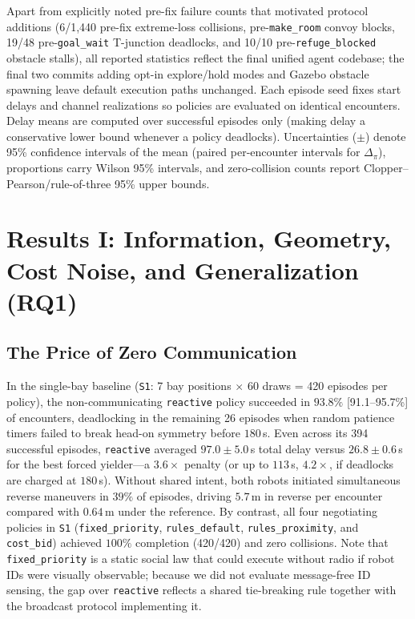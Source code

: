 \documentclass[letterpaper,journal]{IEEEtran}
\newcommand{\cb}{\texttt{cost\_bid}}
\begin{document}
Apart from explicitly noted pre-fix failure counts that motivated protocol additions (6/1,440 pre-fix extreme-loss collisions, pre-\texttt{make\_room} convoy blocks, 19/48 pre-\texttt{goal\_wait} T-junction deadlocks, and 10/10 pre-\texttt{refuge\_blocked} obstacle stalls), all reported statistics reflect the final unified agent codebase; the final two commits adding opt-in explore/hold modes and Gazebo obstacle spawning leave default execution paths unchanged. Each episode seed fixes start delays and channel realizations so policies are evaluated on identical encounters. Delay means are computed over successful episodes only (making delay a conservative lower bound whenever a policy deadlocks). Uncertainties ($\pm$) denote 95\% confidence intervals of the mean (paired per-encounter intervals for $\Delta_\pi$), proportions carry Wilson 95\% intervals, and zero-collision counts report Clopper--Pearson/rule-of-three 95\% upper bounds.

\section{Results I: Information, Geometry, Cost Noise, and Generalization (RQ1)}\label{sec:rq1}

\subsection{The Price of Zero Communication}
In the single-bay baseline (\texttt{S1}: 7 bay positions $\times$ 60 draws = 420 episodes per policy), the non-communicating \texttt{reactive} policy succeeded in $93.8\%$ [91.1--95.7\%] of encounters, deadlocking in the remaining 26 episodes when random patience timers failed to break head-on symmetry before $180$\,s. Even across its 394 successful episodes, \texttt{reactive} averaged $97.0\pm 5.0$\,s total delay versus $26.8\pm 0.6$\,s for the best forced yielder---a $3.6\times$ penalty (or up to $113$\,s, $4.2\times$, if deadlocks are charged at $180$\,s). Without shared intent, both robots initiated simultaneous reverse maneuvers in $39\%$ of episodes, driving $5.7$\,m in reverse per encounter compared with $0.64$\,m under the reference. By contrast, all four negotiating policies in \texttt{S1} (\texttt{fixed\_priority}, \texttt{rules\_default}, \texttt{rules\_proximity}, and \cb) achieved $100\%$ completion (420/420) and zero collisions. Note that \texttt{fixed\_priority} is a static social law that could execute without radio if robot IDs were visually observable; because we did not evaluate message-free ID sensing, the gap over \texttt{reactive} reflects a shared tie-breaking rule together with the broadcast protocol implementing it.
\end{document}
